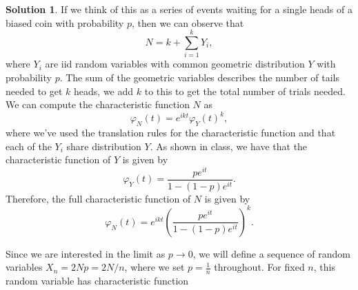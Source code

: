 \documentclass[12pt]{article}
\renewcommand{\phi}{\varphi}
\theoremstyle{definition}
\newtheorem{sol}{Solution}
\theoremstyle{remark}
\begin{document}
\begin{sol}\leavevmode
If we think of this as a series of events waiting for a single heads of a biased coin with probability $p$, then we can observe that 
\begin{equation*}
N = k + \sum_{i=1}^{k} Y_{i},
\end{equation*}
where $Y_{i}$ are iid random variables with common geometric distribution $Y$ with probability $p$. The sum of the geometric variables describes the number of tails needed to get $k$ heads, we add $k$ to this to get the total number of trials needed. We can compute the characteristic function $N$ as 
\begin{equation*}
    \phi_{N}(t) = e^{ikt} \phi_{Y}(t)^{k},
\end{equation*}
where we've used the translation rules for the characteristic function and that each of the $Y_{i}$ share distribution $Y$. As shown in class, we have that the characteristic function of $Y$ is given by
\begin{equation*}
    \phi_{Y}(t) = \frac{p e^{it}}{1 - (1-p)e^{it}}.
\end{equation*}
Therefore, the full characteristic function of $N$ is given by
\begin{equation*}
    \phi_{N}(t) = e^{ikt} \left(\frac{p e^{it}}{1 - (1-p)e^{it}}  \right)^{k}.
\end{equation*}

Since we are interested in the limit as $p\to 0$, we will define a sequence of random variables $X_{n} = 2Np = 2N / n$, where we set $p = \frac{1}{n}$ throughout. For fixed $n$, this random variable has characteristic function


\end{sol}
\end{document}
